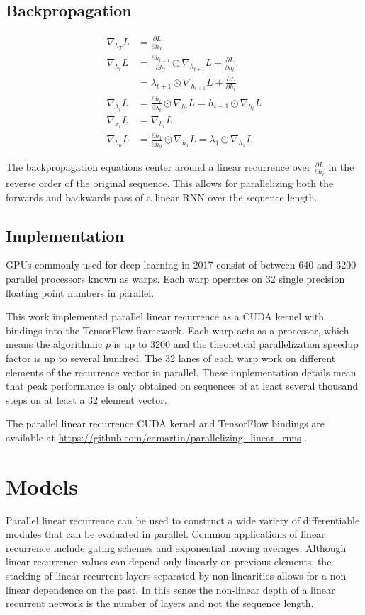 \documentclass{article}
\begin{document}
\subsection{Backpropagation}
\begin{align*}
\nabla_{h_T}L &= \frac{\partial L}{\partial h_T} \\
\nabla_{h_t}L &= \frac{\partial h_{t+1}}{\partial h_t} \odot \nabla_{h_{t+1}} L + \frac{\partial L}{\partial h_t} \\
&= \lambda_{t+1} \odot \nabla_{h_{t+1}} L + \frac{\partial L}{\partial h_t} \\
\nabla_{\lambda_t}L &= \frac{\partial h_t}{\partial\lambda_t} \odot \nabla_{h_t}L = h_{t-1} \odot \nabla_{h_t}L \\
\nabla_{x_t}L &= \nabla_{h_t} L \\
\nabla_{h_0}L &=  \frac{\partial h_1}{\partial h_0} \odot \nabla_{h_1} L = \lambda_1 \odot \nabla_{h_1} L
\end{align*}

The backpropagation equations center around a linear recurrence over $\frac{\partial L}{\partial h_t}$ in the reverse order of the original sequence. This allows for parallelizing both the forwards and backwards pass of a linear RNN over the sequence length.

\subsection{Implementation}
GPUs commonly used for deep learning in 2017 consist of between 640 and 3200 parallel
processors known as warps. Each warp operates on 32 single precision floating
point numbers in parallel.

This work implemented parallel linear recurrence as a CUDA kernel with bindings
into the TensorFlow \citep{abadi2016tensorflow} framework. Each warp acts as a
processor, which means the algorithmic $p$ is up to 3200 and the theoretical
parallelization speedup factor is up to several hundred.  The 32 lanes of each
warp work on different elements of the recurrence vector in parallel. These
implementation details mean that peak performance is only obtained on sequences
of at least several thousand steps on at least a 32 element vector.

The parallel linear recurrence CUDA kernel and TensorFlow bindings are
available at \url{https://github.com/eamartin/parallelizing_linear_rnns} .

\section{Models}
Parallel linear recurrence can be used to construct a wide variety of differentiable modules that can be evaluated in parallel. Common applications of linear recurrence include gating schemes and exponential moving averages. Although linear recurrence values can depend only linearly on previous elements, the stacking of linear recurrent layers separated by non-linearities allows for a non-linear dependence on the past. In this sense the non-linear depth of a linear recurrent network is the number of layers and not the sequence length.
\end{document}
